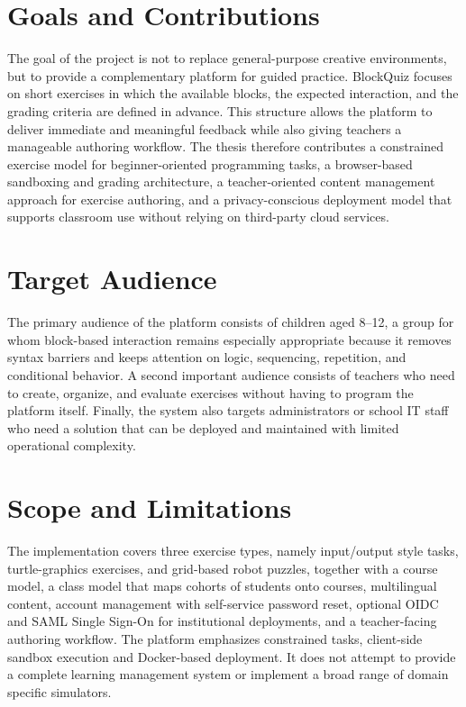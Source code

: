 \section{Goals and Contributions}
The goal of the project is not to replace general-purpose creative environments, but to provide a complementary platform for guided practice. BlockQuiz focuses on short exercises in which
the available blocks, the expected interaction, and the grading criteria are defined in advance.
This structure allows the platform to deliver immediate and meaningful feedback while also giving teachers a manageable authoring workflow.
The thesis therefore contributes a constrained exercise model for beginner-oriented programming tasks, a browser-based sandboxing and grading architecture, a teacher-oriented content management approach
for exercise authoring, and a privacy-conscious deployment model that supports classroom use without relying on third-party cloud services.

\section{Target Audience}
The primary audience of the platform consists of children aged 8--12, a group for whom block-based interaction remains especially appropriate because it removes syntax barriers and keeps attention on
logic, sequencing, repetition, and conditional behavior. A second important audience consists of teachers who need to create, organize, and evaluate exercises without having to
program the platform itself.
Finally, the system also targets administrators or school IT staff who need a solution that can be deployed and maintained with limited operational complexity.


\section{Scope and Limitations}
The implementation covers three exercise types, namely input/output style tasks, turtle-graphics exercises, and grid-based robot puzzles, together with a course model, 
a class model that maps cohorts of students onto courses, multilingual content, account management with self-service password reset, 
optional OIDC and SAML Single Sign-On for institutional deployments, and a teacher-facing authoring workflow. 
The platform emphasizes constrained tasks, client-side sandbox execution and Docker-based deployment. It does not attempt 
to provide a complete learning management system or implement a broad range of domain specific simulators. 

